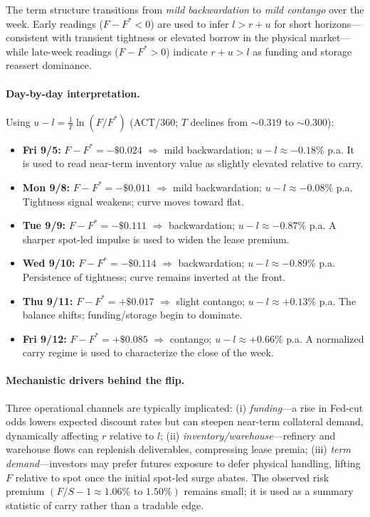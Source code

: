 \documentclass[11pt,a4paper]{article} %
\begin{document}
The term structure transitions from \emph{mild backwardation} to \emph{mild contango} over the week. Early readings (\(F-F^{*}<0\)) are used to infer \(l>r+u\) for short horizons—consistent with transient tightness or elevated borrow in the physical market—while late-week readings (\(F-F^{*}>0\)) indicate \(r+u>l\) as funding and storage reassert dominance.

\paragraph{Day-by-day interpretation.}
Using \(u-l=\frac{1}{T}\ln(F/F^{*})\) (ACT/360; \(T\) declines from \(\sim 0.319\) to \(\sim 0.300\)):
\begin{itemize}
  \item \textbf{Fri 9/5:} \(F-F^{*}=-\$0.024\) \(\Rightarrow\) mild backwardation; \(u-l\approx-0.18\%\) p.a. It is used to read near-term inventory value as slightly elevated relative to carry.
  \item \textbf{Mon 9/8:} \(F-F^{*}=-\$0.011\) \(\Rightarrow\) mild backwardation; \(u-l\approx-0.08\%\) p.a. Tightness signal weakens; curve moves toward flat.
  \item \textbf{Tue 9/9:} \(F-F^{*}=-\$0.111\) \(\Rightarrow\) backwardation; \(u-l\approx-0.87\%\) p.a. A sharper spot-led impulse is used to widen the lease premium.
  \item \textbf{Wed 9/10:} \(F-F^{*}=-\$0.114\) \(\Rightarrow\) backwardation; \(u-l\approx-0.89\%\) p.a. Persistence of tightness; curve remains inverted at the front.
  \item \textbf{Thu 9/11:} \(F-F^{*}=+\$0.017\) \(\Rightarrow\) slight contango; \(u-l\approx+0.13\%\) p.a. The balance shifts; funding/storage begin to dominate.
  \item \textbf{Fri 9/12:} \(F-F^{*}=+\$0.085\) \(\Rightarrow\) contango; \(u-l\approx+0.66\%\) p.a. A normalized carry regime is used to characterize the close of the week.
\end{itemize}

\paragraph{Mechanistic drivers behind the flip.}
Three operational channels are typically implicated: (i) \emph{funding}—a rise in Fed-cut odds lowers expected discount rates but can steepen near-term collateral demand, dynamically affecting \(r\) relative to \(l\); (ii) \emph{inventory/warehouse}—refinery and warehouse flows can replenish deliverables, compressing lease premia; (iii) \emph{term demand}—investors may prefer futures exposure to defer physical handling, lifting \(F\) relative to spot once the initial spot-led surge abates. The observed risk premium \((F/S-1\approx 1.06\% \text{ to } 1.50\%)\) remains small; it is used as a summary statistic of carry rather than a tradable edge.
\end{document}
